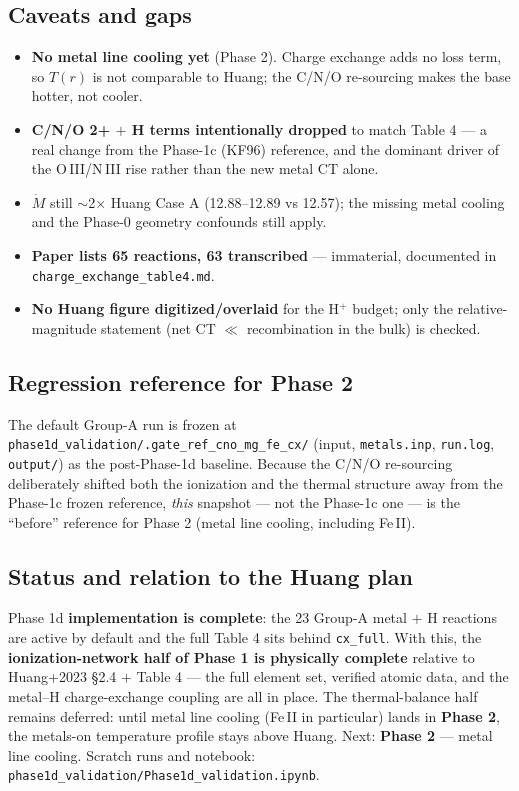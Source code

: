\documentclass[english,a4paper]{kiseon_memo}
\begin{document}
\subsection{Caveats and gaps}

\begin{itemize}
\item \textbf{No metal line cooling yet} (Phase 2). Charge exchange adds no loss
  term, so $T(r)$ is not comparable to Huang; the C/N/O re-sourcing makes the base
  hotter, not cooler.
\item \textbf{C/N/O 2+ $+$ H terms intentionally dropped} to match Table 4 --- a
  real change from the Phase-1c (KF96) reference, and the dominant driver of the
  O\,III/N\,III rise rather than the new metal CT alone.
\item $\dot M$ still $\sim$2$\times$ Huang Case A (12.88--12.89 vs 12.57); the
  missing metal cooling and the Phase-0 geometry confounds still apply.
\item \textbf{Paper lists 65 reactions, 63 transcribed} --- immaterial,
  documented in \texttt{charge\_exchange\_table4.md}.
\item \textbf{No Huang figure digitized/overlaid} for the H$^+$ budget; only the
  relative-magnitude statement (net CT $\ll$ recombination in the bulk) is checked.
\end{itemize}

\subsection{Regression reference for Phase 2}

The default Group-A run is frozen at
\texttt{phase1d\_validation/.gate\_ref\_cno\_mg\_fe\_cx/} (input,
\texttt{metals.inp}, \texttt{run.log}, \texttt{output/}) as the post-Phase-1d
baseline. Because the C/N/O re-sourcing deliberately shifted both the ionization
and the thermal structure away from the Phase-1c frozen reference, \emph{this}
snapshot --- not the Phase-1c one --- is the ``before'' reference for Phase 2
(metal line cooling, including Fe\,II).

\subsection{Status and relation to the Huang plan}

Phase 1d \textbf{implementation is complete}: the 23 Group-A metal $+$ H reactions
are active by default and the full Table 4 sits behind \verb|cx_full|. With this,
the \textbf{ionization-network half of Phase 1 is physically complete} relative to
Huang+2023 \S2.4 $+$ Table 4 --- the full element set, verified atomic data, and
the metal--H charge-exchange coupling are all in place. The thermal-balance half
remains deferred: until metal line cooling (Fe\,II in particular) lands in
\textbf{Phase 2}, the metals-on temperature profile stays above Huang. Next:
\textbf{Phase 2} --- metal line cooling. Scratch runs and notebook:
\texttt{phase1d\_validation/Phase1d\_validation.ipynb}.
\end{document}
